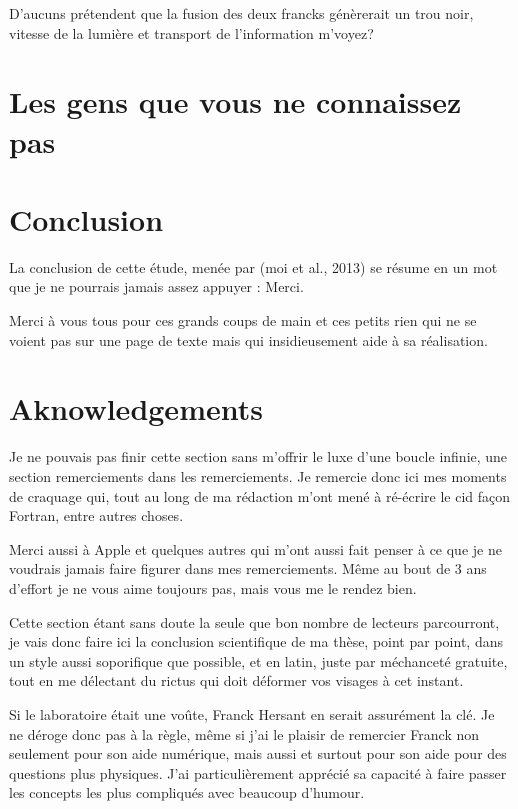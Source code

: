 D'aucuns prétendent que la fusion des deux francks génèrerait un trou noir, vitesse de la lumière et transport de l'information m'voyez?

\section{Les gens que vous ne connaissez pas}

\section{Conclusion}
La conclusion de cette étude, menée par (moi et al., 2013) se résume en un mot que je ne pourrais jamais assez appuyer : Merci. 

Merci à vous tous pour ces grands coups de main et ces petits rien qui ne se voient pas sur une page de texte mais qui insidieusement aide à sa réalisation.

\section{Aknowledgements}
Je ne pouvais pas finir cette section sans m'offrir le luxe d'une boucle infinie, une section remerciements dans les remerciements. Je remercie donc ici mes moments de craquage qui, tout au long de ma rédaction m'ont mené à ré-écrire le cid façon Fortran, entre autres choses. 

Merci aussi à Apple et quelques autres qui m'ont aussi fait penser à ce que je ne voudrais jamais faire figurer dans mes remerciements. Même au bout de 3 ans d'effort je ne vous aime toujours pas, mais vous me le rendez bien. 


Cette section étant sans doute la seule que bon nombre de lecteurs parcourront, je vais donc faire ici la conclusion scientifique de ma thèse, point par point, dans un style aussi soporifique que possible, et en latin, juste par méchanceté gratuite, tout en me délectant du rictus qui doit déformer vos visages à cet instant. 




Si le laboratoire était une voûte, Franck Hersant en serait assurément la clé. Je ne déroge donc pas à la règle, même si j'ai le plaisir de remercier Franck non seulement pour son aide numérique, mais aussi et surtout pour son aide pour des questions plus physiques. J'ai particulièrement apprécié sa capacité à faire passer les concepts les plus compliqués avec beaucoup d'humour.

